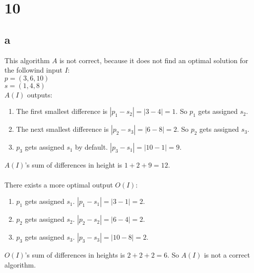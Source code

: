 \documentclass[letterpaper,notitlepage,twoside]{article}
\begin{document}
\section*{10}
\subsection*{a}
This algorithm $A$ is not correct, because it does not find an optimal solution for the followind input $I$:\\
$p = (3, 6, 10)$\\
$s = (1, 4, 8)$\\
$A(I)$ outputs:
\begin{enumerate}
\item The first smallest difference is $|p_1 - s_2| = |3 - 4| = 1$. So $p_1$ gets assigned $s_2$.
\item The next smallest difference is $|p_2 - s_3| = |6 - 8| = 2$. So $p_2$ gets assigned $s_3$.
\item $p_3$ gets assigned $s_1$ by default. $|p_3 - s_1| = |10 - 1| = 9$.
\end{enumerate}
$A(I)$'s sum of differences in height is $1 + 2 + 9 = 12$.\\\\

There exists a more optimal output $O(I)$:
\begin{enumerate}
\item $p_1$ gets assigned $s_1$. $|p_1 - s_1| = |3 - 1| = 2$.
\item $p_2$ gets assigned $s_2$. $|p_2 - s_2| = |6 - 4| = 2$.
\item $p_3$ gets assigned $s_3$. $|p_3 - s_3| = |10 - 8| = 2$.
\end{enumerate}
$O(I)$'s sum of differences in heights is $2 + 2 + 2 = 6$. So $A(I)$ is not a correct algorithm.
\end{document}
